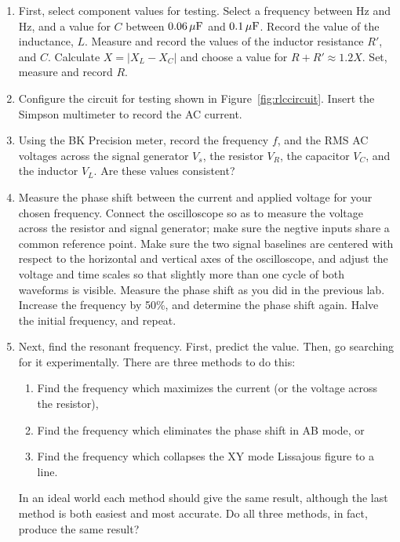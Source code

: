 \documentclass[12pt]{article}
\begin{document}
\begin{enumerate}
\item First, select component values for testing.  Select a frequency
  between \unit[300]{Hz} and \unit[600]{Hz}, and a value for $C$
  between $\unit[0.06]{\mu F}$ and $\unit[0.1]{\mu F}$.  Record the
  value of the inductance, $L$.  Measure and record the values of the
  inductor resistance $R'$, and $C$.  Calculate $X = \left| X_L-X_C
  \right|$ and choose a value for $R + R' \approx 1.2 X$.  Set,
  measure and record $R$.
\item Configure the circuit for testing shown in
  Figure~\ref{fig:rlccircuit}.  Insert the Simpson multimeter to
  record the AC current.
\item Using the BK Precision meter, record the frequency $f$, and the
  RMS AC voltages across the signal generator $V_s$, the resistor
  $V_R$, the capacitor $V_C$, and the inductor $V_L$.  Are these
  values consistent?
\item \label{item:phase} Measure the phase shift between the current
  and applied voltage for your chosen frequency.  Connect the
  oscilloscope so as to measure the voltage across the resistor and
  signal generator; make sure the negtive inputs share a common
  reference point.  Make sure the two signal baselines are centered
  with respect to the horizontal and vertical axes of the
  oscilloscope, and adjust the voltage and time scales so that
  slightly more than one cycle of both waveforms is visible.  Measure
  the phase shift as you did in the previous lab.  Increase the
  frequency by 50\%, and determine the phase shift again.  Halve the
  initial frequency, and repeat.
\item \label{item:phase_resonance} Next, find the resonant frequency.
  First, predict the value.  Then, go searching for it experimentally.
  There are three methods to do this:
  \begin{enumerate}
  \item Find the frequency which maximizes the current (or the voltage
    across the resistor), 
  \item Find the frequency which eliminates the phase shift in AB
    mode, or
  \item Find the frequency which collapses the XY mode Lissajous
    figure to a line.
  \end{enumerate}
  In an ideal world each method should give the same result, although
  the last method is both easiest and most accurate.  Do all three
  methods, in fact, produce the same result?

\end{enumerate}
\end{document}
